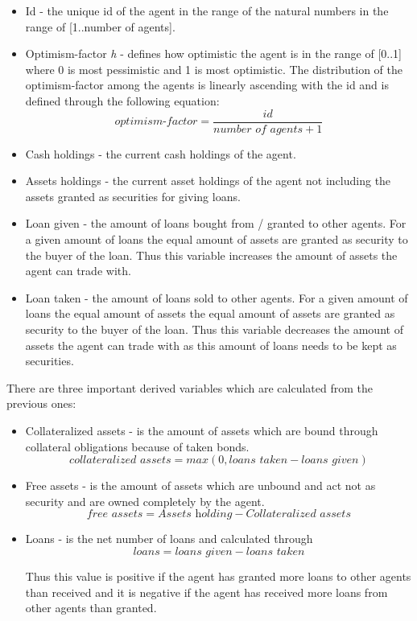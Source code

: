 \documentclass[Bachelorarbeit.tex]{subfiles}
\begin{document}
\begin{itemize}
\item Id - the unique id of the agent in the range of the natural numbers in the range of [1..number of agents].
\item Optimism-factor \textit{h} - defines how optimistic the agent is in the range of [0..1] where 0 is most pessimistic and 1 is most optimistic. The distribution of the optimism-factor among the agents is linearly ascending with the id and is defined through the following equation: 
\begin{equation}
\textit{optimism-factor} = \frac{id}{\textit{number of agents} + 1}
\end{equation}
\item Cash holdings - the current cash holdings of the agent.
\item Assets holdings - the current asset holdings of the agent not including the assets granted as securities for giving loans.
\item Loan given - the amount of loans bought from / granted to other agents. For a given amount of loans the equal amount of assets are granted as security to the buyer of the loan. Thus this variable increases the amount of assets the agent can trade with.
\item Loan taken - the amount of loans sold to other agents. For a given amount of loans the equal amount of assets the equal amount of assets are granted as security to the buyer of the loan. Thus this variable decreases the amount of assets the agent can trade with as this amount of loans needs to be kept as securities.
\end{itemize}

\medskip

There are three important derived variables which are calculated from the previous ones:

\begin{itemize}
\item Collateralized assets - is the amount of assets which are bound through collateral obligations because of taken bonds. 
\begin{equation}
\textit{collateralized assets} = max( 0, \textit{loans taken} - \textit{loans given} )
\end{equation}

\item Free assets - is the amount of assets which are unbound and act not as security and are owned completely by the agent.
\begin{equation}
\textit{free assets} = \textit{Assets holding} - \textit{Collateralized assets}
\end{equation}

\item Loans - is the net number of loans and calculated through 
\begin{equation}
\textit{loans} = \textit{loans given} - \textit{loans taken}
\end{equation}

Thus this value is positive if the agent has granted more loans to other agents than received and it is negative if the agent has received more loans from other agents than granted.
\end{itemize}
\end{document}
